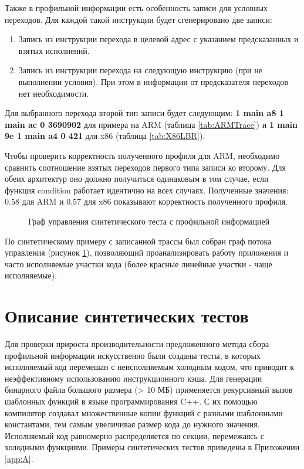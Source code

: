 Также в профильной информации есть особенность записи для условных переходов. Для каждой такой инструкции будет сгенерировано две записи:
\begin{enumerate}[beginpenalty=10000]
  \item Запись из инструкции перехода в целевой адрес с указанием предсказанных и взятых исполнений.
  \item Запись из инструкции перехода на следующую инструкцию (при не выполнении условия). При этом в информации от предсказателя переходов нет необходимости.
\end{enumerate}

Для выбранного перехода второй тип записи будет следующим: \textbf{1 main a8 1 main ac 0 3690902} для примера на ARM (таблица \cref{tab:ARMTrace}) и \textbf{1 main 9e 1 main a4 0 421} для x86 (таблица \cref{tab:X86LBR}).

Чтобы проверить корректность полученного профиля для ARM, необходимо сравнить соотношение взятых переходов первого типа записи ко второму. Для обеих архитектур оно должно получиться одинаковым в том случае, если функция condition работает идентично на всех случаях. Полученные значения: 0.58 для ARM и 0.57 для x86 показывают корректность полученного профиля.

\begin{figure}[!h]
    \caption{Граф управления синтетического теста с профильной информацией}\label{fig:DEMOCFG}
\end{figure}

По синтетическому примеру с записанной трассы был собран граф потока управления (рисунок \cref{fig:DEMOCFG}), позволяющий проанализировать работу приложения и часто исполняемые участки кода (более красные линейные участки - чаще исполняемые).

\section{Описание синтетических тестов}\label{sec:ch2/sec5}
Для проверки прироста производительности предложенного метода  сбора профильной информации искусственно были созданы тесты, в которых исполняемый код перемешан с неисполняемым холодным кодом, что приводит к неэффективному использованию инструкционного кэша. Для генерации бинарного файла большого размера (> 10 МБ) применяется рекурсивный вызов шаблонных функций в языке программирования C++. С их помощью компилятор создавал множественные копии функций с разными шаблонными константами, тем самым увеличивая размер кода до нужного значения. Исполняемый код равномерно распределяется по секции, перемежаясь с холодными функциями. 
Примеры синтетических тестов приведены в Приложении \cref{app:A}.

